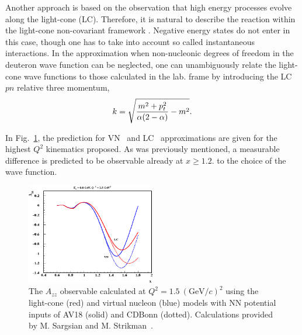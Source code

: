  Another approach is based on the observation that high energy processes
evolve along the light-cone (LC).  Therefore, it is natural to describe the 
reaction within the light-cone non-covariant framework \cite{Frankfurt:1981mk}. 
Negative energy states do not enter in this case, though one has to take into 
account so called instantaneous interactions.
In the approximation when non-nucleonic degrees of freedom in the
deuteron wave function can be neglected, one can unambiguously relate
the light-cone wave functions to those calculated in the lab. frame
by introducing the LC $pn$ relative three momentum,
\begin{equation}
k=\sqrt{{m^2+p_t^2\over \alpha(2-\alpha)} - m^2}.
\end{equation}

In Fig.~\ref{fig:misak}, the prediction for VN~\cite{Sargsian:2009hf} and LC~\cite{Frankfurt:1993sp} approximations are given 
for the highest $Q^2$ kinematics proposed. As was previously mentioned, a measurable 
difference is predicted to be observable already at $x\ge 1.2$.
to the choice of the wave function.  
 
 

\begin{figure}
\begin{center}
\includegraphics[width=0.50\textwidth]{figs/mark_misak_azz.eps}
\caption{\label{fig:misak} The $A_{zz}$ observable calculated at $Q^2=1.5~(\mathrm{GeV}/c)^2$ using the light-cone (red) and virtual nucleon (blue) models with NN potential inputs of AV18 (solid) and CDBonn (dotted). Calculations provided by M. Sargsian and M. Strikman~\cite{Sargsian:2014fla}.}
\end{center}
\end{figure}

